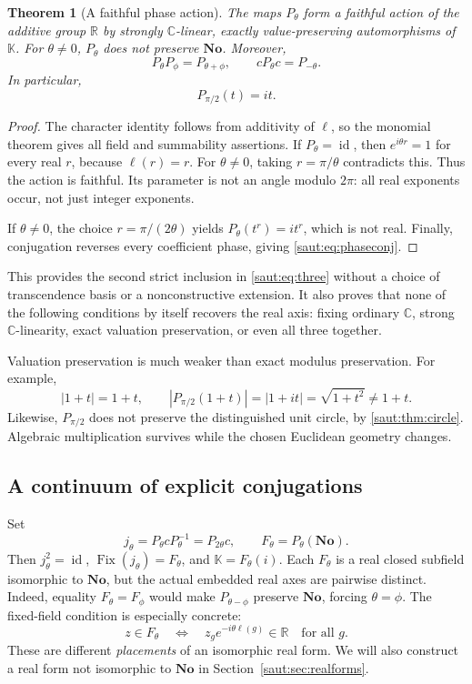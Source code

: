 \documentclass[11pt]{article}
\newtheorem{theorem}{Theorem}[section]
\theoremstyle{definition}
\theoremstyle{remark}
\newcommand{\No}{\mathbf{No}}
\newcommand{\R}{\mathbb R}
\newcommand{\C}{\mathbb C}
\newcommand{\K}{\mathbb K}
\newcommand{\id}{\operatorname{id}}
\newcommand{\Fix}{\operatorname{Fix}}
\numberwithin{equation}{section}
\begin{document}
\begin{theorem}[A faithful phase action]\label{saut:thm:phase}
The maps $P_\theta$ form a faithful action of the additive group $\R$ by
strongly $\C$-linear, exactly value-preserving automorphisms of $\K$.
For $\theta\ne0$, $P_\theta$ does not preserve $\No$. Moreover,
\begin{equation}\label{saut:eq:phaseconj}
 P_\theta P_\phi=P_{\theta+\phi},\qquad
 cP_\theta c=P_{-\theta}.
\end{equation}
In particular,
\[
 P_{\pi/2}(t)=it.
\]
\end{theorem}
\begin{proof}
The character identity follows from additivity of $\ell$, so the
monomial theorem gives all field and summability assertions. If
$P_\theta=\id$, then $e^{i\theta r}=1$ for every real $r$, because
$\ell(r)=r$. For $\theta\ne0$, taking $r=\pi/\theta$ contradicts this.
Thus the action is faithful. Its parameter is not an angle modulo $2\pi$:
all real exponents occur, not just integer exponents.

If $\theta\ne0$, the choice $r=\pi/(2\theta)$ yields
$P_\theta(t^r)=it^r$, which is not real. Finally, conjugation reverses every
coefficient phase, giving \eqref{saut:eq:phaseconj}.
\end{proof}

This provides the second strict inclusion in \eqref{saut:eq:three} without a
choice of transcendence basis or a nonconstructive extension. It also proves
that none of the following conditions by itself recovers the real axis:
fixing ordinary $\C$, strong $\C$-linearity, exact valuation preservation,
or even all three together.

Valuation preservation is much weaker than exact modulus preservation.
For example,
\[
 |1+t|=1+t,
 \qquad |P_{\pi/2}(1+t)|=|1+it|=\sqrt{1+t^2}\ne1+t.
\]
Likewise, $P_{\pi/2}$ does not preserve the distinguished unit circle,
by \cref{saut:thm:circle}. Algebraic multiplication survives while the chosen
Euclidean geometry changes.

\subsection{A continuum of explicit conjugations}

Set
\begin{equation}\label{saut:eq:twistedconj}
 j_\theta=P_\theta cP_\theta^{-1}=P_{2\theta}c,
 \qquad F_\theta=P_\theta(\No).
\end{equation}
Then $j_\theta^2=\id$, $\Fix(j_\theta)=F_\theta$, and
$\K=F_\theta(i)$. Each $F_\theta$ is a real closed subfield isomorphic to
$\No$, but the actual embedded real axes are pairwise distinct.
Indeed, equality $F_\theta=F_\phi$ would make $P_{\theta-\phi}$ preserve
$\No$, forcing $\theta=\phi$. The fixed-field condition is especially
concrete:
\begin{equation}\label{saut:eq:twistedcoeff}
 z\in F_\theta\quad\Longleftrightarrow\quad
 z_g e^{-i\theta\ell(g)}\in\R\quad\text{for all }g.
\end{equation}
These are different \emph{placements} of an isomorphic real form. We will
also construct a real form not isomorphic to $\No$ in
Section~\ref{saut:sec:realforms}.
\end{document}
